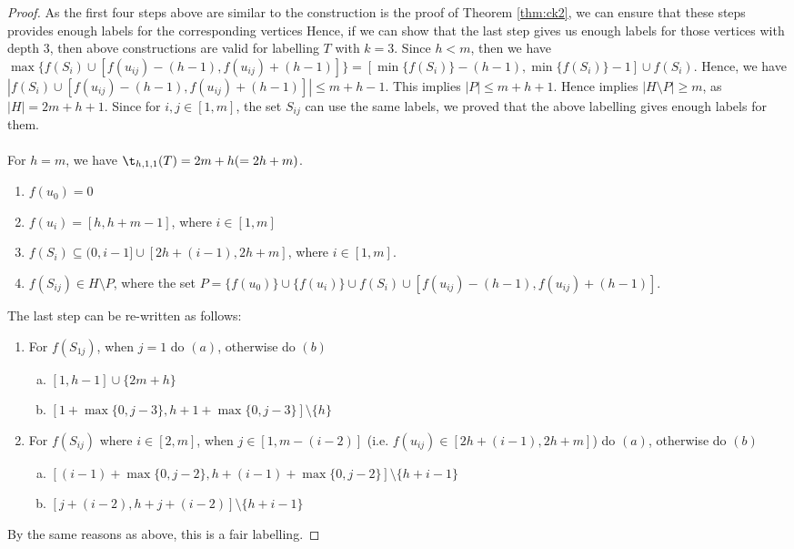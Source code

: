 \begin{proof}
As the first four steps above are similar to the construction is the proof of Theorem \ref{thm:ck2}, we can ensure that these steps provides enough labels for the corresponding vertices Hence, if we can show that the last step gives us enough labels for those vertices with depth $3$, then above constructions are valid for labelling $T$ with $k = 3$. Since $h < m$, then we have $\max\{f(S_i) \cup [f(u_{ij}) - (h-1), f(u_{ij}) + (h-1)]\} = [\min\{f(S_i)\} - (h-1),\min\{f(S_i)\}-1]\cup f(S_i)$. Hence, we have $|f(S_i) \cup [f(u_{ij}) - (h-1), f(u_{ij}) + (h-1)]| \le m+h-1$. This implies $|P| \le m+h+1$. Hence implies $|H \setminus P| \ge m$, as $|H| = 2m+h+1$. Since for $i, j \in [1,m]$, the set $S_{ij}$ can use the same labels, we proved that the above labelling gives enough labels for them. 
\\
\\
For $h = m$, we have $\t_{h,1,1}(T) = 2m+h (= 2h+m)$. 
\begin{enumerate}[(1)]
\item $f(u_0) = 0$ 
\item $f(u_i) = [h, h+m-1]$, where $i \in [1,m]$ 
\item $f(S_i) \subseteq (0, i-1] \cup [2h+(i-1), 2h+m]$, where $i \in [1,m]$. 
\item $f(S_{ij}) \in H \setminus P$, where the set $P =  \{f(u_0)\} \cup \{f(u_i)\} \cup f(S_i) \cup [f(u_{ij}) - (h-1), f(u_{ij}) + (h-1)]$. 
\end{enumerate}
The last step can be re-written as follows:
\begin{enumerate}[(4.1)]
\item For $f(S_{1j})$, when $j = 1$ do $(a)$, otherwise do $(b)$
\begin{enumerate}[(a)]
\item $[1,h-1] \cup \{2m+h\}$
\item $[1+ \max\{0, j-3\}, h+1+\max\{0, j-3\}] \setminus \{h\}$
\end{enumerate}
\item For $f(S_{ij})$ where $i \in [2,m]$, when $j \in [1, m-(i-2)]$ (i.e. $f(u_{ij}) \in [2h+(i-1), 2h+m]$) do $(a)$, otherwise do $(b)$
\begin{enumerate}[(a)]
\item $[(i-1)+\max\{0, j-2\}, h+(i-1) + \max\{0, j-2\}] \setminus \{h+i-1\}$
\item $[j+(i-2), h+j+(i-2)] \setminus \{h+i-1\}$
\end{enumerate}
\end{enumerate}
By the same reasons as above, this is a fair labelling.

\end{proof}
